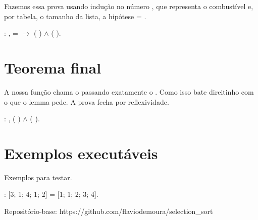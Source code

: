    Fazemos essa prova usando indução no número , que representa o combustível e, por tabela, o tamanho da lista, a hipótese   = . 
\begin{coqdoccode}
\coqdocemptyline
\coqdocnoindent
{}  :\coqdoceol
\coqdocindent{1.00em}
\coqdockw{\ensuremath{\forall}}  ,\coqdoceol
\coqdocindent{2.00em}
  =  \ensuremath{\rightarrow}\coqdoceol
\coqdocindent{2.00em}
  (  ) \ensuremath{\land}\coqdoceol
\coqdocindent{2.00em}
  (  ).\coqdoceol
\coqdocemptyline
\end{coqdoccode}
\section{Teorema final}




    A nossa função   chama o  passando exatamente o  . 
    Como isso bate direitinho com o que o lemma  pede. A prova fecha por reflexividade.
\begin{coqdoccode}
\coqdocemptyline
\coqdocnoindent
{}  :\coqdoceol
\coqdocindent{1.00em}
\coqdockw{\ensuremath{\forall}} ,\coqdoceol
\coqdocindent{2.00em}
  ( ) \ensuremath{\land}\coqdoceol
\coqdocindent{2.00em}
  ( ).\coqdoceol
\coqdocemptyline
\end{coqdoccode}
\section{Exemplos executáveis}




    Exemplos para testar. 
\begin{coqdoccode}
\coqdocemptyline
\coqdocemptyline
\coqdocnoindent
{}  :\coqdoceol
\coqdocindent{1.00em}
 [3; 1; 4; 1; 2] = [1; 1; 2; 3; 4].\coqdoceol
\coqdocemptyline
\end{coqdoccode}
Repositório-base: https://github.com/flaviodemoura/selection\_sort 
\begin{coqdoccode}
\end{coqdoccode}
